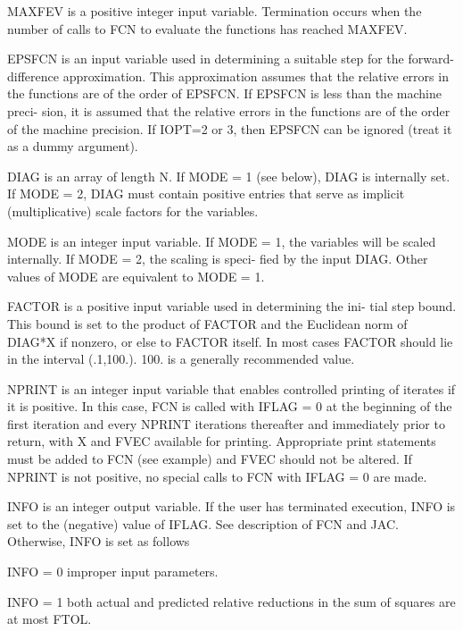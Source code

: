\documentclass[11pt,twoside,nolof]{starlink}
\begin{document}
\begin{terminalv}
       MAXFEV is a positive integer input variable.  Termination occurs
         when the number of calls to FCN to evaluate the functions
         has reached MAXFEV.

       EPSFCN is an input variable used in determining a suitable step
         for the forward-difference approximation.  This approximation
         assumes that the relative errors in the functions are of the
         order of EPSFCN.  If EPSFCN is less than the machine preci-
         sion, it is assumed that the relative errors in the functions
         are of the order of the machine precision.  If IOPT=2 or 3,
         then EPSFCN can be ignored (treat it as a dummy argument).

       DIAG is an array of length N.  If MODE = 1 (see below), DIAG is
         internally set.  If MODE = 2, DIAG must contain positive
         entries that serve as implicit (multiplicative) scale factors
         for the variables.

       MODE is an integer input variable.  If MODE = 1, the variables
         will be scaled internally.  If MODE = 2, the scaling is speci-
         fied by the input DIAG.  Other values of MODE are equivalent
         to MODE = 1.

       FACTOR is a positive input variable used in determining the ini-
         tial step bound.  This bound is set to the product of FACTOR
         and the Euclidean norm of DIAG*X if nonzero, or else to FACTOR
         itself.  In most cases FACTOR should lie in the interval
         (.1,100.).  100. is a generally recommended value.

       NPRINT is an integer input variable that enables controlled
         printing of iterates if it is positive.  In this case, FCN is
         called with IFLAG = 0 at the beginning of the first iteration
         and every NPRINT iterations thereafter and immediately prior
         to return, with X and FVEC available for printing. Appropriate
         print statements must be added to FCN (see example) and
         FVEC should not be altered.  If NPRINT is not positive, no
         special calls to FCN with IFLAG = 0 are made.

       INFO is an integer output variable.  If the user has terminated
        execution, INFO is set to the (negative) value of IFLAG.  See
        description of FCN and JAC. Otherwise, INFO is set as follows

         INFO = 0  improper input parameters.

         INFO = 1  both actual and predicted relative reductions in the
                   sum of squares are at most FTOL.


\end{terminalv}
\end{document}
